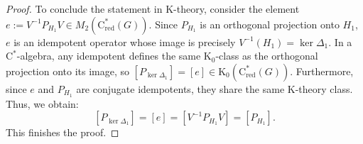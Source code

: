 \documentclass[10pt,a4paper]{amsart}
\newcommand{\Cs}{\mathrm{C}^*}
\newcommand{\Csr}{\mathrm{C}^*_{\text{red}}}
\begin{document}
\begin{proof}
To conclude the statement in K-theory, consider the element $e := V^{-1} P_{H_1} V \in M_2(\Csr(G))$. Since $P_{H_1}$ is an orthogonal projection onto $H_1$, $e$ is an idempotent operator whose image is precisely $V^{-1}(H_1) = \ker \Delta_1$. In a $\Cs$-algebra, any idempotent defines the same $\mathrm K_0$-class as the orthogonal projection onto its image, so $[P_{\ker \Delta_1}] = [e] \in \mathrm K_0(\Csr(G))$. Furthermore, since $e$ and $P_{H_1}$ are conjugate idempotents, they share the same K-theory class. Thus, we obtain:
\[
[P_{\ker \Delta_1}] = [e] = [V^{-1} P_{H_1} V] = [P_{H_1}].
\]
This finishes the proof.
	\end{proof}
\end{document}

